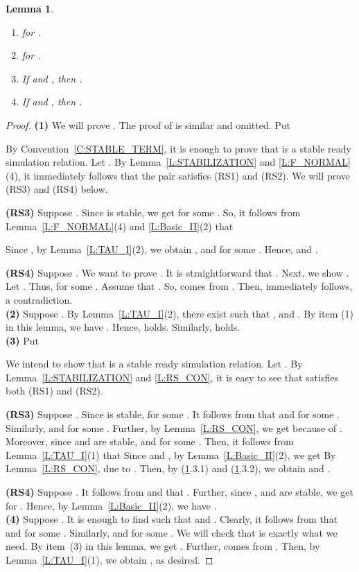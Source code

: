 \documentclass{elsarticle}
\theoremstyle{plain}
\newtheorem{lemma}[theorem]{Lemma}
\theoremstyle{definition}
\begin{document}
\begin{lemma}\label{L:CON_ID_I}\hfill
     \begin{enumerate}
      \item  for .
      \item  for .
      \item If  and , then .
      \item If  and , then .
    \end{enumerate}
\end{lemma}
\begin{proof}
\textbf{(1)} We will prove . The proof of  is similar and omitted.
    Put
     
     By Convention~\ref{C:STABLE_TERM}, it is enough to prove that  is a stable ready simulation relation. Let .
    By Lemma~\ref{L:STABILIZATION} and \ref{L:F_NORMAL}(4), it immediately follows that the pair  satisfies (RS1) and (RS2). We will prove (RS3) and (RS4) below.

    \textbf{(RS3)} Suppose . Since  is stable, we get  for some .
    So, it follows from Lemma~\ref{L:F_NORMAL}(4) and \ref{L:Basic_II}(2) that
    
    Since , by Lemma~\ref{L:TAU_I}(2), we obtain ,  and   for some . Hence,  and .

    \textbf{(RS4)} Suppose . We want to prove .
    It is straightforward that .
    Next, we show .
    Let .
    Thus,  for some .
    Assume that . So,  comes from .
    Then,  immediately follows, a contradiction. \\

\noindent \textbf{(2)}
  Suppose . By Lemma~\ref{L:TAU_I}(2), there exist  such that  ,  and .
  By item (1) in this lemma, we have . Hence,  holds. Similarly,  holds.\\


\noindent \textbf{(3)} Put
        
We intend to show that  is a stable ready simulation relation. Let .
    By Lemma~\ref{L:STABILIZATION} and \ref{L:RS_CON}, it is easy to see that  satisfies both (RS1) and (RS2).

   \textbf{(RS3)} Suppose . Since  is stable,  for some .
   It follows from  that  and  for some .
    Similarly,  and  for some .
     Further, by Lemma~\ref{L:RS_CON}, we get  because of .
   Moreover, since  and  are stable,  and  for some .
   Then, it follows from Lemma~\ref{L:TAU_I}(1) that 
   Since   and , by Lemma~\ref{L:Basic_II}(2), we get 
    By Lemma~\ref{L:RS_CON},  due to .
    Then, by (\ref{L:CON_ID_I}.3.1) and (\ref{L:CON_ID_I}.3.2), we obtain  and  .

   \textbf{(RS4)} Suppose .
    It follows from  and  that .
    Further, since ,  and  are stable, we get  for .
    Hence, by Lemma~\ref{L:Basic_II}(2), we have  .\\

\noindent \textbf{(4)} Suppose .
    It is enough to find  such that  and .
    Clearly, it follows from  that  and  for some . Similarly,  and  for some .
    We will check that  is exactly what we need.
    By item~(3) in this lemma, we get .
    Further,  comes from . Then,  by Lemma~\ref{L:TAU_I}(1), we obtain , as desired.
\end{proof}
\end{document}

